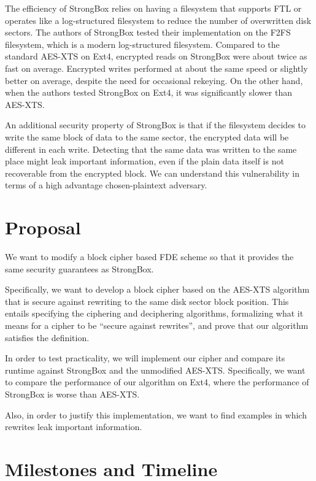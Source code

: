 \documentclass[11pt,twocolumn]{article}
\begin{document}
	The efficiency of StrongBox relies on having a filesystem that supports FTL
	or operates like a log-structured filesystem to reduce the number of overwritten disk sectors.
	The authors of StrongBox tested their implementation on the F2FS filesystem,
	which is a modern log-structured filesystem.
	Compared to the standard AES-XTS on Ext4,
	encrypted reads on StrongBox were about twice as fast on average.
	Encrypted writes performed at about the same speed or slightly better on average,
	despite the need for occasional rekeying.
	On the other hand, when the authors tested StrongBox on Ext4,
	it was significantly slower than AES-XTS.
	
	An additional security property of StrongBox
	is that if the filesystem decides to write the same block of data to the same sector,
	the encrypted data will be different in each write.
	Detecting that the same data was written to the same place
	might leak important information,
	even if the plain data itself is not recoverable from the encrypted block.
	We can understand this vulnerability in terms of a high advantage chosen-plaintext adversary.
	
	\section*{Proposal}
	
	We want to modify a block cipher based FDE scheme
	so that it provides the same security guarantees as StrongBox.
	
	Specifically,
	we want to develop a block cipher based on the AES-XTS algorithm
	that is secure against rewriting to the same disk sector block position.
	This entails specifying the ciphering and deciphering algorithms,
	formalizing what it means for a cipher to be ``secure against rewrites'',
	and prove that our algorithm satisfies the definition.
	
	In order to test practicality,
	we will implement our cipher
	and compare its runtime against StrongBox and the unmodified AES-XTS.
	Specifically,
	we want to compare the performance of our algorithm on Ext4,
	where the performance of StrongBox is worse than AES-XTS.
	
	Also, in order to justify this implementation,
	we want to find examples in which rewrites leak important information.
	
	\section*{Milestones and Timeline}
	
\end{document}
